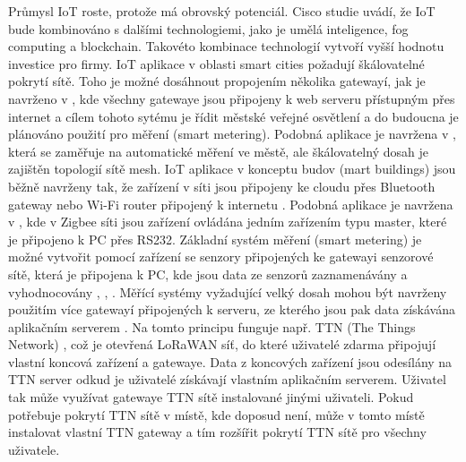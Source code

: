 Průmysl IoT roste, protože má obrovský potenciál. Cisco studie \cite{IoT cisco study} uvádí, že IoT bude kombinováno s dalšími technologiemi, jako je umělá inteligence, fog computing a blockchain. Takovéto kombinace technologií vytvoří vyšší hodnotu investice pro firmy.
IoT aplikace v oblasti smart cities požadují škálovatelné pokrytí sítě. Toho je možné dosáhnout propojením několika gatewayí, jak je navrženo v \cite{Flexible Wireless Sensor Network for smart lighting applications}, kde všechny gatewaye jsou připojeny k web serveru přístupným přes internet a cílem tohoto sytému je řídit městské veřejné osvětlení a do budoucna je plánováno použití pro měření (smart metering).
Podobná aplikace je navržena v \cite{Design and Implementation of an IoT Assisted Real Time ZigBee Mesh WSN}, která se zaměřuje na automatické měření ve městě, ale škálovatelný dosah je zajištěn topologií sítě mesh.
IoT aplikace v konceptu budov (mart buildings) jsou běžně navrženy tak, že zařízení v síti jsou připojeny ke cloudu přes Bluetooth gateway nebo Wi-Fi router připojený k internetu \cite{Internet of Things (IoT) for building Smart Home System}.
Podobná aplikace je navržena  v \cite{Building a Smart Home System with WSN and Service Robot}, kde v Zigbee síti jsou zařízení ovládána jedním zařízením typu master, které je připojeno k PC přes RS232.
Základní systém měření (smart metering) je možné vytvořit pomocí zařízení se senzory připojených ke gatewayi senzorové sítě, která je připojena k PC, kde jsou data ze senzorů zaznamenávány a vyhodnocovány \cite{A Meter Reading System Based on WSN}, \cite{Smart Water Meter System for User-Centric Consumption Measurement}, \cite{Radio Data Infrastructure for Remote Monitoring}.
Měřící systémy vyžadující velký dosah mohou být navrženy použitím více gatewayí připojených k serveru, ze kterého jsou pak data získávána aplikačním serverem \cite{Smart Electric Meter Using LoRA Protocols and Iot applications}. 
Na tomto principu funguje např. TTN (The Things Network) \cite{ttn}, což je otevřená LoRaWAN síť, do které uživatelé zdarma připojují vlastní koncová zařízení a gatewaye. Data z koncových zařízení jsou odesílány na TTN server odkud je uživatelé získávají vlastním aplikačním serverem. Uživatel tak může využívat gatewaye TTN sítě instalované jinými uživateli. Pokud potřebuje pokrytí TTN sítě v místě, kde doposud není, může v tomto místě instalovat vlastní TTN gateway a tím rozšířit pokrytí TTN sítě pro všechny uživatele.


